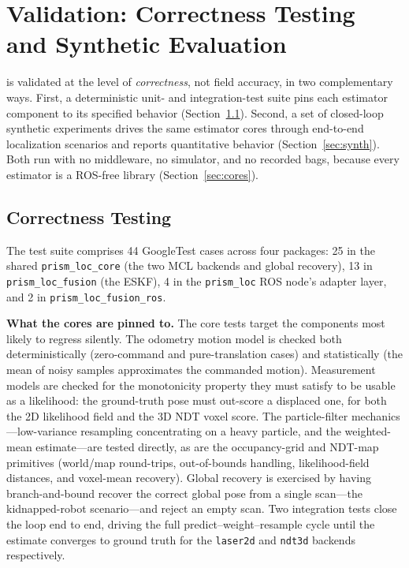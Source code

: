 \section{Validation: Correctness Testing and Synthetic
Evaluation}\label{sec:validation}

\prismloc{} is validated at the level of \emph{correctness}, not field
accuracy, in two complementary ways. First, a deterministic unit- and
integration-test suite pins each estimator component to its specified
behavior (Section~\ref{sec:tests}). Second, a set of closed-loop
synthetic experiments drives the same estimator cores through
end-to-end localization scenarios and reports quantitative behavior
(Section~\ref{sec:synth}). Both run with no middleware, no simulator,
and no recorded bags, because every estimator is a ROS-free library
(Section~\ref{sec:cores}).

\subsection{Correctness Testing}\label{sec:tests}

The test suite comprises 44 GoogleTest cases across four
packages: 25 in the shared \texttt{prism\_loc\_core} (the two MCL
backends and global recovery), 13 in \texttt{prism\_loc\_fusion} (the
ESKF), 4 in the \texttt{prism\_loc} ROS node's adapter layer, and 2 in
\texttt{prism\_loc\_fusion\_ros}.

\textbf{What the cores are pinned to.}
The core tests target the components most likely to regress silently.
The odometry motion model is checked both deterministically
(zero-command and pure-translation cases) and statistically (the mean
of noisy samples approximates the commanded motion). Measurement models
are checked for the monotonicity property they must satisfy to be usable
as a likelihood: the ground-truth pose must out-score a displaced one,
for both the 2D likelihood field and the 3D NDT voxel score. The
particle-filter mechanics---low-variance resampling concentrating on a
heavy particle, and the weighted-mean estimate---are tested directly, as
are the occupancy-grid and NDT-map primitives (world/map round-trips,
out-of-bounds handling, likelihood-field distances, and voxel-mean
recovery). Global recovery is exercised by having branch-and-bound
recover the correct global pose from a single scan---the kidnapped-robot
scenario---and reject an empty scan. Two integration tests close the
loop end to end, driving the full predict--weight--resample cycle until
the estimate converges to ground truth for the \texttt{laser2d} and
\texttt{ndt3d} backends respectively.

